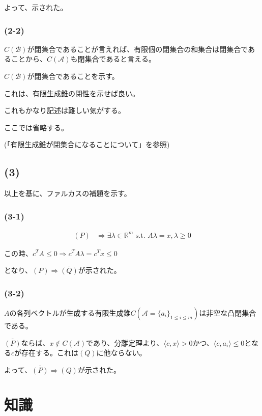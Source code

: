 \documentclass[a4paper, 10pt, dvipdfmx]{jlreq}
\begin{document}
よって、示された。

\subsubsection*{(2-2)}

$C(\mathcal{B})$が閉集合であることが言えれば、有限個の閉集合の和集合は閉集合であることから、$C(\mathcal{A})$も閉集合であると言える。

$C(\mathcal{B})$が閉集合であることを示す。

これは、有限生成錐の閉性を示せば良い。

これもかなり記述は難しい気がする。

ここでは省略する。

(「有限生成錐が閉集合になることについて」を参照)

\subsection*{(3)}

以上を基に、ファルカスの補題を示す。

\subsubsection*{(3-1)}

\begin{align*}
  (P) & \Rightarrow \exists \lambda \in \mathbb{R}^m \text{ s.t. } A\lambda =x,\lambda \geq 0
\end{align*}

この時、$c^TA \leq 0 \Rightarrow c^TA\lambda =c^Tx \leq 0$

となり、$(P)\Rightarrow \overline{(Q)}$が示された。

\subsubsection*{(3-2)}

$A$の各列ベクトルが生成する有限生成錐$C(\mathcal{A}=\{a_i\}_{1\leq i \leq m})$は非空な凸閉集合である。

$\overline{(P)}$ならば、$x \notin C(\mathcal{A})$であり、分離定理より、$\langle c,x\rangle >0$かつ、$\langle c,a_i\rangle \leq 0$となる$c$が存在する。これは$(Q)$に他ならない。

よって、$\overline{(P)}\Rightarrow (Q)$が示された。

\section{知識}
\end{document}
